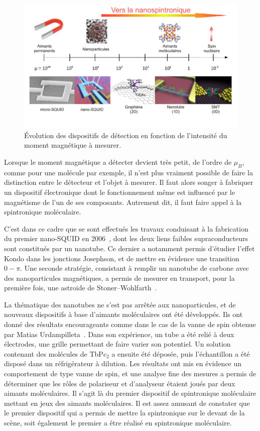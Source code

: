 \begin{figure}
\centering \includegraphics[scale=0.45]{Spintronique/Group1/Group1.pdf}
\caption{\'Evolution des dispositifs de détection en fonction de l'intensité du moment magnétique à mesurer.}
\label{Group1}
\end{figure}



Lorsque le moment magnétique a détecter devient très petit, de l'ordre de $\mu_B$, comme pour une molécule par exemple, il n'est plus vraiment possible de faire la distinction entre le détecteur et l'objet à mesurer. Il faut alors songer à fabriquer un dispositif électronique dont le fonctionnement même est influencé par le magnétisme de l'un de ses composants. Autrement dit, il faut faire appel à la spintronique moléculaire.

C'est dans ce cadre que se sont effectués les travaux conduisant à la fabrication du premier nano-SQUID en 2006~\cite{CleuziouJ.-P.2006}, dont les deux liens faibles supraconducteurs sont constitués par un nanotube. Ce dernier a notamment permis d'étudier l'effet Kondo dans les jonctions Josephson, et de mettre en évidence une transition $0-\pi$. Une seconde stratégie, consistant à remplir un nanotube de carbone avec des nanoparticules magnétiques, a permis de mesurer en transport, pour la première fois, une astroide de Stoner–Wohlfarth~\cite{Cleuziou2011}.

La thématique des nanotubes ne s'est pas arrêtée aux nanoparticules, et de nouveaux dispositifs à base d'aimants moléculaires ont été développés. Ils ont donné des résultats encourageants comme dans le cas de la vanne de spin obtenue par Matias Urdampilleta~\cite{Urdampilleta2011}. Dans son expérience, un tube a été relié à deux électrodes, une grille permettant de faire varier son potentiel. Un solution contenant des molécules de TbPc$_{2}$ a ensuite été déposée, puis l'échantillon a été disposé dans un réfrigérateur à dilution. Les résultats ont mis en évidence un comportement de type vanne de spin, et une analyse fine des mesures a permis de déterminer que les rôles de polariseur et d'analyseur étaient joués par deux aimants moléculaires. Il s'agit là du premier dispositif de spintronique moléculaire mettant en jeux des aimants moléculaires. Il est assez amusant de constater que le premier dispositif qui a permis de mettre la spintronique sur le devant de la scène, soit également le premier a être réalisé en spintronique moléculaire.

